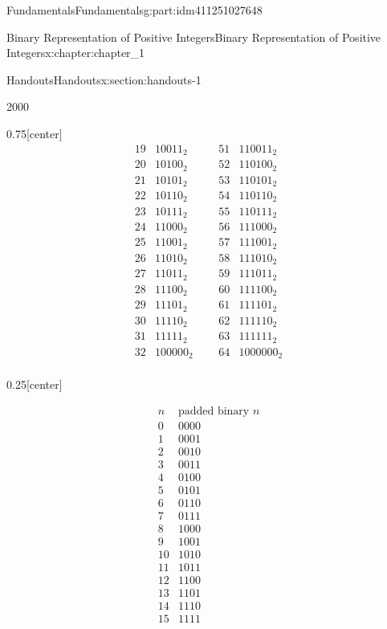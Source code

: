 \documentclass[oneside,10pt,]{book}
\numberwithin{equation}{section}
\begin{document}
\begin{partptx}{Fundamentals}{}{Fundamentals}{}{}{g:part:idm411251027648}
\begin{chapterptx}{Binary Representation of Positive Integers}{}{Binary Representation of Positive Integers}{}{}{x:chapter:chapter_1}
\begin{sectionptx}{Handouts}{}{Handouts}{}{}{x:section:handouts-1}
\begin{sidebyside}{2}{0}{0}{0}
\begin{sbspanel}{0.75}[center]
\begin{equation*}
\begin{array}{ccccc}
19 & 10011_2 & \text{     } &
51 & 110011_2 \\
20 & 10100_2 & \text{     } &
52 & 110100_2 \\
21 & 10101_2 & \text{     } &
53 & 110101_2 \\
22 & 10110_2 & \text{     } &
54 & 110110_2 \\
23 & 10111_2 & \text{     } &
55 & 110111_2 \\
24 & 11000_2 & \text{     } &
56 & 111000_2 \\
25 & 11001_2 & \text{     } &
57 & 111001_2 \\
26 & 11010_2 & \text{     } &
58 & 111010_2 \\
27 & 11011_2 & \text{     } &
59 & 111011_2 \\
28 & 11100_2 & \text{     } &
60 & 111100_2 \\
29 & 11101_2 & \text{     } &
61 & 111101_2 \\
30 & 11110_2 & \text{     } &
62 & 111110_2 \\
31 & 11111_2 & \text{     } &
63 & 111111_2 \\
32 & 100000_2 & \text{     }
& 64 & 1000000_2 \\
\end{array}
\end{equation*}
%
\end{sbspanel}%
\begin{sbspanel}{0.25}[center]%
\par
%
\begin{equation*}
\begin{array}{cc}
n & \text{padded
binary } n \\
0 & 0000 \\
1 & 0001 \\
2 & 0010 \\
3 & 0011 \\
4 & 0100 \\
5 & 0101 \\
6 & 0110 \\
7 & 0111 \\
8 & 1000 \\
9 & 1001 \\
10 & 1010 \\
11 & 1011 \\
12 & 1100 \\
13 & 1101 \\
14 & 1110 \\
15 & 1111 \\
\end{array}
\end{equation*}

\end{sbspanel}
\end{sidebyside}
\end{sectionptx}
\end{chapterptx}
\end{partptx}
\end{document}
